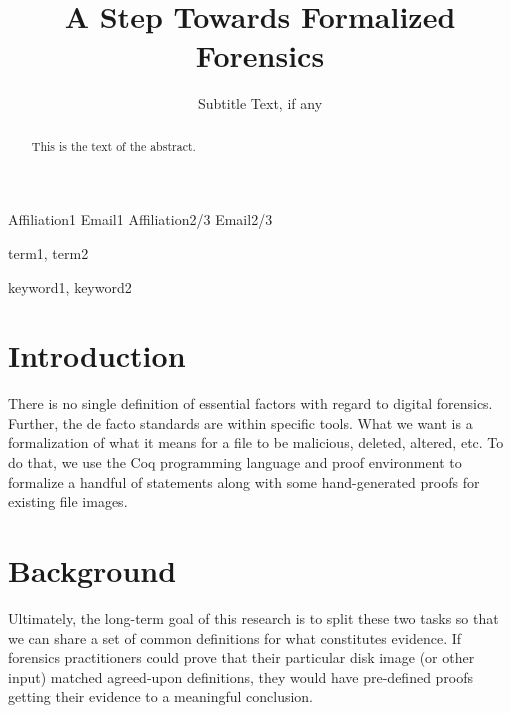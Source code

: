 \documentclass[nocopyrightspace]{sigplanconf}
\begin{document}
\lstset{language=coq, basicstyle=\ttfamily\scriptsize, columns=flexible,
keepspaces=true}

\setlength{\pdfpageheight}{\paperheight}
\setlength{\pdfpagewidth}{\paperwidth}



\title{A Step Towards Formalized Forensics}
\subtitle{Subtitle Text, if any}

           {Affiliation1}
           {Email1}
           {Affiliation2/3}
           {Email2/3}

\maketitle

\begin{abstract}
This is the text of the abstract.
\end{abstract}


\terms
term1, term2

\keywords
keyword1, keyword2

\section{Introduction}

There is no single definition of essential factors with regard to digital
forensics. Further, the de facto standards are within specific tools. What we
want is a formalization of what it means for a file to be malicious, deleted,
altered, etc. To do that, we use the Coq programming language and proof
environment to formalize a handful of statements along with some
hand-generated proofs for existing file images.

\section{Background}
Ultimately, the long-term goal of this research is to split these two tasks so
that we can share a set of common definitions for what constitutes evidence.
If forensics practitioners could prove that their particular disk image (or
other input) matched agreed-upon definitions, they would have pre-defined
proofs getting their evidence to a meaningful conclusion.
\end{document}
